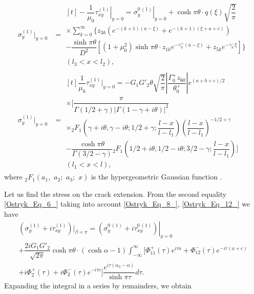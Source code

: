 \begin{equation} \label{Ostryk_Eq_44_} 
\begin{aligned}
	\sigma _{y}^{(1)} \Big|_{y=0} &=
	\begin{multlined}[t]
		-\dfrac{1}{\mu _{0} } \left. \tau _{xy}^{(1)} \right|_{y=0} =\left. \sigma _{y}^{0\, (1)} \right|_{y=0} +\cosh \pi \theta \cdot q(\xi ) \sqrt{\dfrac{2}{\pi } } 
		\\
		\times\sum _{k=0}^{\infty }\bigg\{z_{3k} \left(e^{-(k+1)(a-\xi )} +e^{-(k+1)(\xi +a+c)} \right) 	
		\\
		-\dfrac{\sinh \pi \theta }{D^{2} } \left[(1+\mu _{0}^{2} )\sinh \pi \theta \cdot z_{1k} e^{-\gamma _{k}^{+} (a-\xi )} +z_{5k} e^{-\gamma _{k}^{-} \xi } \right]\bigg\} \\ (l_{3} <x<l_{2} ),
	\end{multlined}
	\\
	\sigma _{y}^{(1)} \Big|_{y=0} &=
	\begin{multlined}[t]
		\dfrac{1}{\mu _{0} }  \tau _{xy}^{(1)} \Big|_{y=0} =-G_{1} G'_{2} \theta \sqrt{\dfrac{2}{\pi } } \left|\dfrac{\Gamma _{0}^{+} z_{60} }{\theta _{0}^{+} } \right|e^{(a+b+c)/2} 
		\\
		\times\bigg[\dfrac{\pi }{\Gamma (1/2 +\gamma )\left|\Gamma (1-\gamma +i\theta )\right|^{2} } 
		\\
		\times {}_{2}F_{1} \left(\gamma +i\theta , \gamma -i\theta ; 1/2 +\gamma;  \dfrac{l-x}{l-l_{1} } \right)\left(\dfrac{l-x}{l-l_{1} } \right)^{-1/2 +\gamma }  
		\\
		-\dfrac{\cosh \pi \theta }{\Gamma (3/2 -\gamma )}  {}_{2} F_{1} \left(1/2 +i\theta , 1/2 -i\theta; 3/2 -\gamma ; \dfrac{l-x}{l-l_{1} } \right)\bigg] \\ (l_{1} <x<l),  
	\end{multlined}
\end{aligned}
\end{equation} 
where ${}_{2} F_{1} \left(a_{1} ,\, \, a_{2} ;\, \, a_{3} ;\, \, x\right)$ is the hypergeometric Gaussian function \cite{Ostryk75}.

Let us find the stress on the crack extension. From the second equality \eqref{Ostryk_Eq_6_} taking into account \eqref{Ostryk_Eq_8_}, \eqref{Ostryk_Eq_12_} we have
\begin{multline} \label{Ostryk_Eq_45_} 
\left(\sigma _{y}^{(1)} +i\tau _{xy}^{(1)} \right)\Big|_{\beta =\pi } =\left. \left(\sigma _{y}^{0\, (1)} +i\tau _{xy}^{0\, (1)} \right)\right|_{y=0} 
\\
+\dfrac{2iG_{1} G'_{2} }{\sqrt{2\pi } } \cosh \pi \theta \cdot (\cosh \alpha -1) \int _{-\infty }^{\infty }\big[\Phi _{11}^{+} (\tau )e^{i\tau a} +\Phi _{12}^{-} (\tau )e^{-i\tau (a+c)} 
\\
+i\Phi _{2}^{+} (\tau )+i\Phi _{2}^{-} (\tau )e^{-i\tau c} \big]\dfrac{e^{i\tau (\alpha _{3} -\alpha )} }{\sinh \pi \tau } d\tau  .  
\end{multline} 
Expanding the integral in a series by remainders, we obtain

